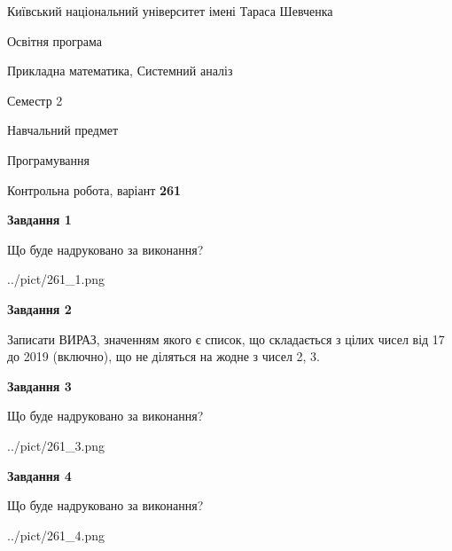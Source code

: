 \documentclass[12pt, ukrainian]{article}
\begin{document}
{{\begin {small}\par
{ \center  Київський національний університет імені Тараса Шевченка \par}
{\parbox {5 cm}{Освітня програма \hfill}{\parbox {8 cm}{Прикладна математика, Системний аналіз \hfill}}\parbox {5 cm}{\hfill Семестр 2}}\par
{\parbox {5 cm} {Навчальний предмет \hfill}\parbox {7 cm}{Програмування \hfill}\parbox {6cm}{\hfill}\par}\vspace{-7pt} \end{small}}{\center Контрольна робота, варіант  \No \textbf
{ 261 }\par}}
{
\begin {large}
{\begin {center}\textbf{Завдання 1}\end {center}}\par
Що буде надруковано за виконання?\par\par
\begin{center}
	{../pict/261_1.png}
\end{center}
\newpage

{\begin {center}\textbf{Завдання 2}\end {center}}\par

Записати ВИРАЗ, значенням якого є список, що складається з цілих чисел від 17 до 2019 (включно), що не діляться на жодне з чисел 2, 3.\par
\newpage

{\begin {center}\textbf{Завдання 3}\end {center}}\par
Що буде надруковано за виконання?
\begin{center}
	{../pict/261_3.png}
\end{center}
\newpage

{\begin {center}\textbf{Завдання 4}\end {center}}\par
Що буде надруковано за виконання?\par
\begin{center}
	{../pict/261_4.png}
\end{center}
\newpage


\end{large}}
\end{document}
